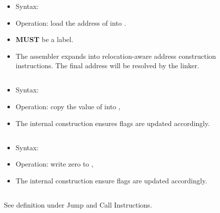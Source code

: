 \begin{itemize}
  \item Syntax: 
  \item Operation: load the address of  into .
  \item {} \textbf{MUST} be a label.
  \item The assembler expands  into relocation-aware address
        construction instructions. The final address will be resolved by the
        linker.
\end{itemize}

\subsection{}

\begin{itemize}
  \item Syntax: 
  \item Operation: copy the value of  into , 
  \item The internal construction ensures flags are updated accordingly.
\end{itemize}

\subsection{}

\begin{itemize}
  \item Syntax: 
  \item Operation: write zero to , 
  \item The internal construction ensure flags are updated accordingly.
\end{itemize}

\subsection{}

See definition under Jump and Call Instructions.

\subsection{}

